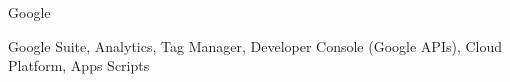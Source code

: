 \begin{cventries}
	\zcventry
	{Google} %
	{
		\begin{cvitems} %
			\item {Google Suite, Analytics, Tag Manager, Developer Console (Google APIs), Cloud Platform, Apps Scripts}
		\end{cvitems}
	}
	
	
\end{cventries}
